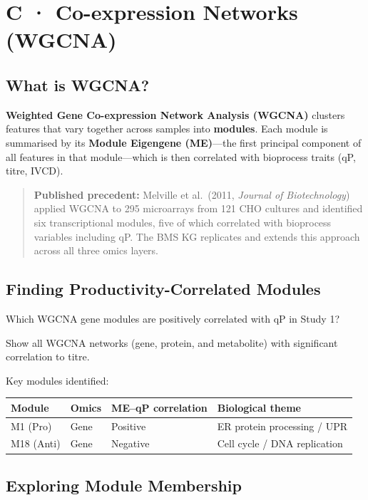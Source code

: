 \documentclass[
  letterpaper,
  oneside,
  open=any]{scrbook}
\newcounter{none} %
\begin{document}
\section{C · Co-expression Networks (WGCNA)}\label{sec-wgcna}

\subsection{What is WGCNA?}\label{what-is-wgcna}

\textbf{Weighted Gene Co-expression Network Analysis (WGCNA)} clusters
features that vary together across samples into \textbf{modules}. Each
module is summarised by its \textbf{Module Eigengene (ME)}---the first
principal component of all features in that module---which is then
correlated with bioprocess traits (qP, titre, IVCD).

\begin{quote}
\textbf{Published precedent:} Melville et al.~(2011, \emph{Journal of
Biotechnology}) applied WGCNA to 295 microarrays from 121 CHO cultures
and identified six transcriptional modules, five of which correlated
with bioprocess variables including qP. The BMS KG replicates and
extends this approach across all three omics layers.
\end{quote}

\subsection{Finding Productivity-Correlated
Modules}\label{finding-productivity-correlated-modules}

Which WGCNA gene modules are positively correlated with qP in Study 1?

Show all WGCNA networks (gene, protein, and metabolite) with significant
correlation to titre.

Key modules identified:

{\def\LTcaptype{none} %
\begin{longtable}[]{@{}llll@{}}
\toprule\noalign{}
Module & Omics & ME--qP correlation & Biological theme \\
\midrule\noalign{}
\endhead
\bottomrule\noalign{}
\endlastfoot
M1 (Pro) & Gene & Positive & ER protein processing / UPR \\
M18 (Anti) & Gene & Negative & Cell cycle / DNA replication \\
\end{longtable}
}

\subsection{Exploring Module
Membership}\label{exploring-module-membership}
\end{document}

